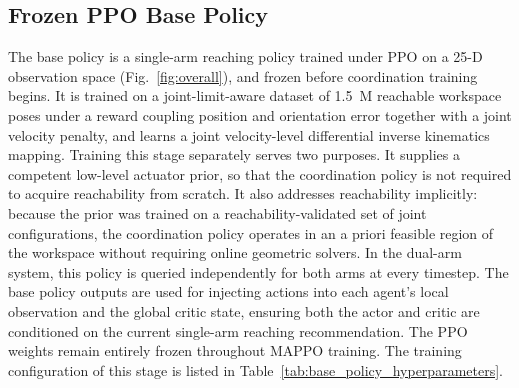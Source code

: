 \documentclass[a4paper,fleqn]{cas-dc}
\begin{document}
\subsection{Frozen PPO Base Policy}
\label{base_ppo}
The base policy is a single-arm reaching policy trained under PPO \cite{schulman2017proximal} on a 25-D observation space (Fig.~\ref{fig:overall}), and frozen before coordination training begins. It is trained on a joint-limit-aware dataset of 1.5~M reachable workspace poses under a reward coupling position and orientation error together with a joint velocity penalty, and learns a joint velocity-level differential inverse kinematics mapping. Training this stage separately serves two purposes. It supplies a competent low-level actuator prior, so that the coordination policy is not required to acquire reachability from scratch. It also addresses reachability implicitly: because the prior was trained on a reachability-validated set of joint configurations, the coordination policy operates in an a priori feasible region of the workspace without requiring online geometric solvers. In the dual-arm system, this policy is queried independently for both arms at every timestep. The base policy outputs are used for injecting actions into each agent's local observation and the global critic state, ensuring both the actor and critic are conditioned on the current single-arm reaching recommendation. The PPO weights remain entirely frozen throughout MAPPO training. The training configuration of this stage is listed in Table~\ref{tab:base_policy_hyperparameters}.
\end{document}
